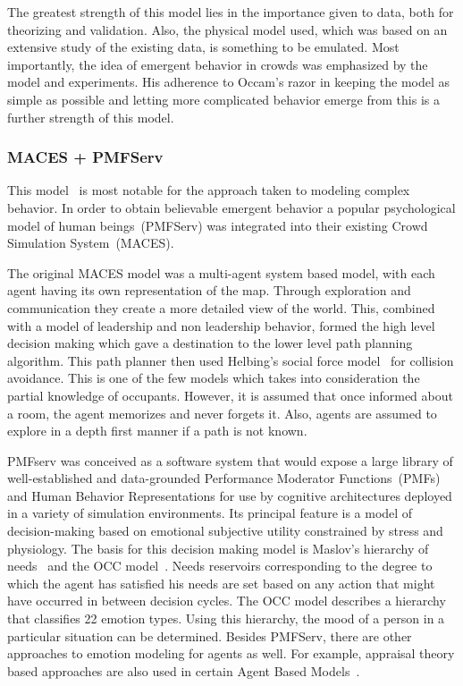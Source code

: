 The greatest strength of this model lies in the importance given to data, both for theorizing and validation. Also, the physical model used, which was based on an extensive study of the existing data, is something to be emulated. Most importantly, the idea of emergent behavior in crowds was emphasized by the model and experiments. His adherence to Occam's razor in keeping the model as simple as possible and letting more complicated behavior emerge from this is a further strength of this model.


\subsubsection{MACES + PMFServ}
\label{MACESPMFServ}

This model~\cite{Pelechano:2005vp} is most notable for the approach taken to modeling complex behavior. In order to obtain believable emergent behavior a popular psychological model of human beings~(PMFServ) was integrated into their existing Crowd Simulation System~(MACES).

The original MACES model was a multi-agent system based model, with each agent having its own representation of the map. Through exploration and communication they create a more detailed view of the world. This, combined with a model of leadership and non leadership behavior, formed the high level decision making which gave a destination to the lower level path planning algorithm. This path planner then used Helbing's social force model~\cite{Helbing:1995ie} for collision avoidance. This is one of the few models which takes into consideration the partial knowledge of occupants. However, it is assumed that once informed about a room, the agent memorizes and never forgets it. Also, agents are assumed to explore in a depth first manner if a path is not known.

PMFserv was conceived as a software system that would expose a large library of well-established and data-grounded Performance Moderator Functions~(PMFs) and Human Behavior Representations for use by cognitive architectures deployed in a variety of simulation environments. Its principal feature is a model of decision-making based on emotional subjective utility constrained by stress and physiology. The basis for this decision making model is Maslov's hierarchy of needs~\cite{Maslow:1943vr} and the OCC model~\cite{Orton:1990tx}. Needs reservoirs corresponding to the degree to which the agent has satisfied his needs are set based on any action that might have occurred in between decision cycles. The OCC model describes a hierarchy that classifies 22 emotion types. Using this hierarchy, the mood of a person in a particular situation can be determined. Besides PMFServ, there are other approaches to emotion modeling for agents as well. For example, appraisal theory based approaches are also used in certain Agent Based Models~\cite{Aydt:2011wz}.

